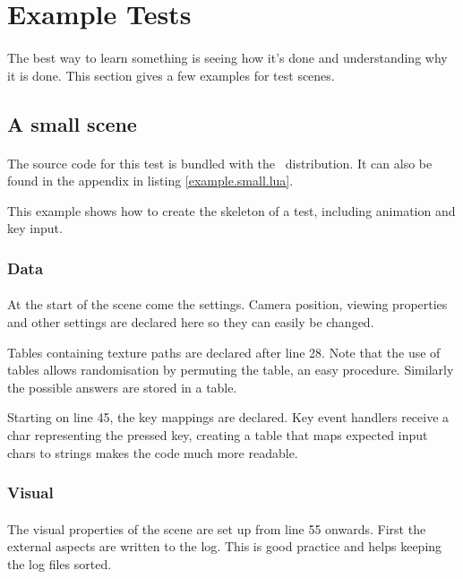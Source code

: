 \section{Example Tests\label{Example}}
\paragraph{}
The best way to learn something is seeing how it's done and understanding why it is done.
This section gives a few examples for test scenes.

\subsection{A small scene}
\paragraph{}
The source code for this test is bundled with the \ER\ distribution.
It can also be found in the appendix in listing \ref{example.small.lua}.

This example shows how to create the skeleton of a test, including animation and key input.

\subsubsection{Data}
\paragraph{}
At the start of the scene come the settings.
Camera position, viewing properties and other settings are declared here so they can easily be changed.

Tables containing texture paths are declared after line 28.
Note that the use of tables allows randomisation by permuting the table, an easy procedure.
Similarly the possible answers are stored in a table.

Starting on line 45, the key mappings are declared.
Key event handlers receive a char representing the pressed key, creating a table that maps expected input chars to strings makes the code much more readable.

\subsubsection{Visual}
\paragraph{}
The visual properties of the scene are set up from line 55 onwards.
First the external aspects are written to the log.
This is good practice and helps keeping the log files sorted.

